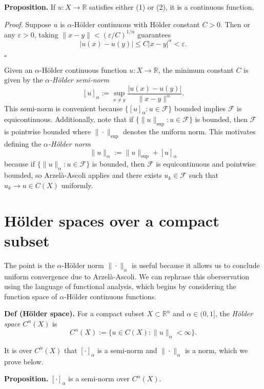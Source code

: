 \documentclass[
]{article}
\begin{document}
\textbf{Proposition.} If \(u: X \to \mathbb{R}\) satisfies either (1) or
(2), it is a continuous function.

\emph{Proof.} Suppose \(u\) is \(\alpha\)-Hölder continuous with Hölder
constant \(C > 0\). Then or any \(\varepsilon > 0\), taking
\(\|x-y\| < (\varepsilon/C)^{1/\alpha}\) guarantees \[
    |u(x)-u(y)| \leq C|x-y|^{\alpha} < \varepsilon.
\]

\(\square\)

Given an \(\alpha\)-Hölder continuous function \(u: X \to \mathbb{R}\),
the minimum constant \(C\) is given by the \emph{\(\alpha\)-Hölder
semi-norm} \[
    [u]_{\alpha} := \sup_{x \neq y}\frac{|u(x) - u(y)|}{\|x-y\|^{\alpha}}.
\] This semi-norm is convenient because
\(\{ [u]_{\alpha}: u \in \mathcal{F}\}\) bounded implies \(\mathcal{F}\)
is equicontinuous. Additionally, note that if
\(\{ \|u\|_{\sup}: u \in \mathcal{F}\}\) is bounded, then
\(\mathcal{F}\) is pointwise bounded where \(\| \cdot \|_{\sup}\)
denotes the uniform norm. This motivates defining the
\emph{\(\alpha\)-Hölder norm} \[
    \|u\|_{\alpha} := \|u\|_{\sup} + [u]_{\alpha}
\] because if \(\{\|u\|_{\alpha}: u \in \mathcal{F}\}\) is bounded, then
\(\mathcal{F}\) is equicontinuous and pointwise bounded, so
Arzelà-Ascoli applies and there exists \(u_k \in \mathcal{F}\) such that
\(u_k \to u \in C(X)\) uniformly.

\hypertarget{huxf6lder-spaces-over-a-compact-subset}{%
\section{Hölder spaces over a compact
subset}\label{huxf6lder-spaces-over-a-compact-subset}}

The point is the \(\alpha\)-Hölder norm \(\|\cdot\|_{\alpha}\) is useful
because it allows us to conclude uniform convergence due to
Arzelà-Ascoli. We can rephrase this oberservation using the language of
functional analysis, which begins by considering the function space of
\(\alpha\)-Hölder continuous functions.

\textbf{Def (Hölder space).} For a compact subset
\(X \subset \mathbb{R}^n\) and \(\alpha \in (0,1]\), the \emph{Hölder
space} \(C^{\alpha}(X)\) is \[
    C^{\alpha}(X) := \{u \in C(X) : \|u\|_{\alpha} < \infty\}.
\]

It is over \(C^{\alpha}(X)\) that \([\cdot]_{\alpha}\) is a semi-norm
and \(\|\cdot\|_{\alpha}\) is a norm, which we prove below.

\textbf{Proposition.} \([\cdot]_{\alpha}\) is a semi-norm over
\(C^{\alpha}(X)\).
\end{document}
